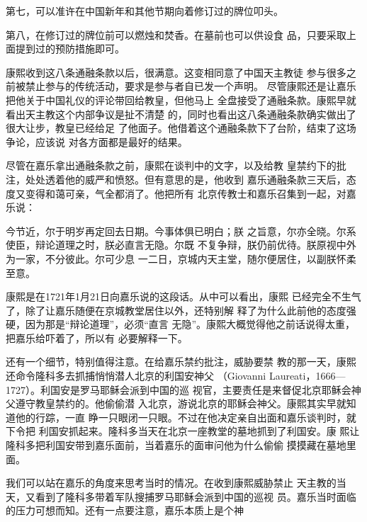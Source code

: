 {\bookkai 第七，可以准许在中国新年和其他节期向着修订过的牌位叩头。}%
\par
{\bookkai 第八，在修订过的牌位前可以燃烛和焚香。在墓前也可以供设食}%
{\bookkai 品，只要采取上面提到过的预防措施即可。}{}%
\par
康熙收到这八条通融条款以后，很满意。这变相同意了中国天主教徒%
参与很多之前被禁止参与的传统活动，要求是参与者自已发一个声明。%
尽管康熙还是让嘉乐把他关于中国礼仪的评论带回给教皇，但他马上%
全盘接受了通融条款。康熙早就看出天主教这个内部争议是扯不清楚%
的，同时也看出这八条通融条款确实做出了很大让步，教皇已经给足%
了他面子。他借着这个通融条款下了台阶，结束了这场争论，应该说%
对各方面都是最好的结果。%
\par
尽管在嘉乐拿出通融条款之前，康熙在谈判中的文字，以及给教%
皇禁约下的批注，处处透着他的威严和愤怒。但有意思的是，他收到%
嘉乐通融条款三天后，态度又变得和蔼可亲，气全都消了。他把所有%
北京传教士和嘉乐召集到一起，对嘉乐说：%
\par
{\bookkai 今节近，尔于明岁再定回去日期。今事体俱已明白；朕}%
{\bookkai 之旨意，尔亦全晓。尔系使臣，辩论道理之时，朕必直言无隐。尔既}%
{\bookkai 不复争辩，朕仍前优待。朕原视中外为一家，不分彼此。尔可少息}%
{\bookkai 一二日，京城内天主堂，随尔便居住，以副朕怀柔至意。}%
\par
康熙是在1721年1月21日向嘉乐说的这段话。从中可以看出，康熙%
已经完全不生气了，除了让嘉乐随便在京城教堂居住以外，还特别解%
释了为什么此前他的态度强硬，因为那是“辩论道理”，必须“直言%
无隐”。康熙大概觉得他之前话说得太重，把嘉乐给吓着了，所以有%
必要解释一下。%
\par
还有一个细节，特别值得注意。在给嘉乐禁约批注，威胁要禁%
教的那一天，康熙还命令隆科多去抓捕悄悄潜人北京的利国安神父%
（Giovanni Laureati，1666—1727）。利国安是罗马耶稣会派到中国的巡%
视官，主要责任是来督促北京耶稣会神父遵守教皇禁约的。他偷偷潜%
入北京，游说北京的耶稣会神父。康熙其实早就知道他的行踪，一直%
睁一只眼闭一只眼。不过在他决定亲自出面和嘉乐谈判时，就下令把%
利国安抓起来。隆科多当天在北京一座教堂的墓地抓到了利国安。康%
熙让隆科多把利国安带到嘉乐面前，当着嘉乐的面审问他为什么偷偷%
摸摸藏在墓地里面。%
\par
我们可以站在嘉乐的角度来思考当时的情况。在收到康熙威胁禁止%
天主教的当天，又看到了隆科多带着军队搜捕罗马耶稣会派到中国的巡视%
员。嘉乐当时面临的压力可想而知。还有一点要注意，嘉乐本质上是个神%
